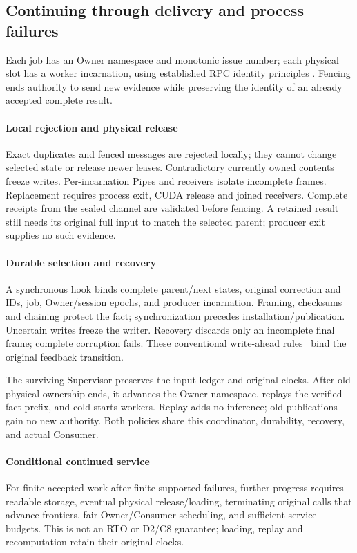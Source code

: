 \subsection{Continuing through delivery and process failures}
\label{subsec:native_resilience}
Each job has an Owner namespace and monotonic issue number; each physical
slot has a worker incarnation, using established RPC identity principles
\cite{birrell1984rpc}. Fencing ends authority to send new evidence while
preserving the identity of an already accepted complete result.

\paragraph{Local rejection and physical release}
Exact duplicates and fenced messages are rejected locally; they cannot
change selected state or release newer leases. Contradictory currently
owned contents freeze writes. Per-incarnation Pipes and receivers isolate
incomplete frames. Replacement requires process exit, CUDA release and
joined receivers. Complete receipts from the sealed channel are validated
before fencing. A retained result still needs its original full input to
match the selected parent; producer exit supplies no such evidence.

\paragraph{Durable selection and recovery}
A synchronous hook binds complete parent/next states, original correction
and IDs, job, Owner/session epochs, and producer incarnation. Framing,
checksums and chaining protect the fact; synchronization precedes
installation/publication. Uncertain writes freeze the writer. Recovery
discards only an incomplete final frame; complete corruption fails.
These conventional write-ahead rules~\cite{mohan1992aries} bind the
original feedback transition.

The surviving Supervisor preserves the input ledger and original clocks.
After old physical ownership ends, it advances the Owner namespace,
replays the verified fact prefix, and cold-starts workers. Replay adds no
inference; old publications gain no new authority. Both policies share
this coordinator, durability, recovery, and actual Consumer.

\paragraph{Conditional continued service}
\label{prop:continued_service}
For finite accepted work after finite supported failures, further progress
requires readable storage, eventual physical release/loading, terminating
original calls that advance frontiers, fair Owner/Consumer scheduling,
and sufficient service budgets. This is not an RTO or D2/C8 guarantee;
loading, replay and recomputation retain their original clocks.

